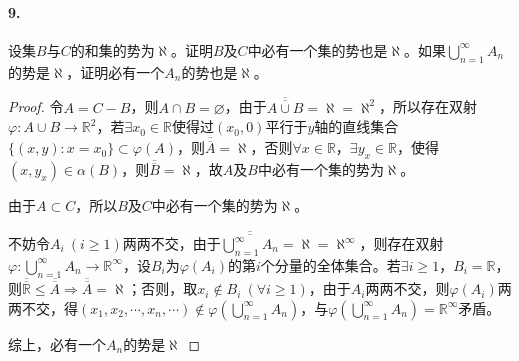 \documentclass[12pt, a4paper, oneside]{ctexart}
\begin{document}
\paragraph{9.}设集$B$与$C$的和集的势为$\aleph$。证明$B$及$C$中必有一个集的势也是$\aleph$。如果$\bigcup\limits_{n=1}^{\infty}A_n$的势是$\aleph$，证明必有一个$A_n$的势也是$\aleph$。

\begin{proof}
    令$A = C - B$，则$A\cap B = \varnothing$，由于$\overline{\overline{A\cup B}} = \aleph = \aleph^2$，所以存在双射$\varphi:A\cup B\rightarrow \mathbb{R}^2$，若$\exists x_0\in \mathbb{R}$使得过$(x_0,0)$平行于$y$轴的直线集合$\{(x, y):x=x_0\}\subset \varphi(A)$，则$\overline{\overline{A}} = \aleph$，否则$\forall x\in \mathbb{R}$，$\exists y_x\in \mathbb{R}$，使得$(x,y_x)\in \alpha(B)$，则$\overline{\overline{B}} = \aleph$，故$A$及$B$中必有一个集的势为$\aleph$。

    由于$A\subset C$，所以$B$及$C$中必有一个集的势为$\aleph$。

    不妨令$A_i\ (i\geqslant 1)$两两不交，由于$\overline{\overline{\bigcup\limits_{n=1}^{\infty}A_n}} = \aleph = \aleph^\infty$，则存在双射$\varphi:\bigcup\limits_{n=1}^{\infty}A_n \rightarrow \mathbb{R}^\infty$，设$B_i$为$\varphi(A_i)$的第$i$个分量的全体集合。若$\exists i\geqslant 1$，$B_i = \mathbb{R}$，则$\overline{\overline{\mathbb{R}}}\leqslant\overline{\overline{A}}\Rightarrow\overline{\overline{A}}=\aleph$；否则，取$x_i\notin B_i\ (\forall i \geqslant 1)$，由于$A_i$两两不交，则$\varphi(A_i)$两两不交，得$(x_1,x_2,\cdots,x_n,\cdots)\notin\varphi(\bigcup\limits_{n=1}^{\infty}A_n)$，与$\varphi(\bigcup\limits_{n=1}^{\infty}A_n) = \mathbb{R}^{\infty}$矛盾。

    综上，必有一个$A_n$的势是$\aleph$
\end{proof}
\end{document}
